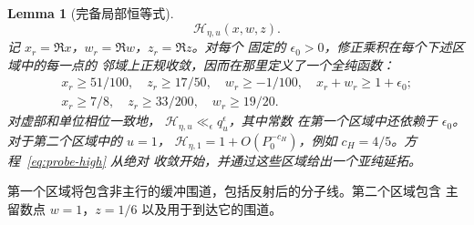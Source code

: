\documentclass[11pt,a4paper]{article}
\numberwithin{equation}{section}
\numberwithin{figure}{section}
\newtheorem{lemma}[theorem]{Lemma}
\theoremstyle{definition}
\theoremstyle{remark}
\begin{document}
\begin{lemma}[完备局部恒等式]
\begin{equation}
 \mathcal H_{\eta,u}(x,w,z).
\end{equation}
记 $x_r=\Re x$，$w_r=\Re w$，$z_r=\Re z$。对每个
固定的 $\epsilon_0>0$，修正乘积在每个下述区域中的每一点的
邻域上正规收敛，因而在那里定义了一个全纯函数：
\begin{align}
 x_r\ge51/100,\quad z_r\ge17/50,\quad w_r\ge-1/100,\quad
 x_r+w_r\ge1+\epsilon_0;\label{eq:local-region-one}\\
 x_r\ge7/8,\quad z_r\ge33/200,\quad w_r\ge19/20.
 \label{eq:local-region-two}
\end{align}
对虚部和单位相位一致地，
$\mathcal H_{\eta,u}\ll_\epsilon q_u^\epsilon$，其中常数
在第一个区域中还依赖于 $\epsilon_0$。对于第二个区域中的 $u=1$，
$\mathcal H_{\eta,1}=1+O(P_0^{-c_H})$，例如
$c_H=4/5$。方程~\eqref{eq:probe-high} 从绝对
收敛开始，并通过这些区域给出一个亚纯延拓。
\end{lemma}

第一个区域将包含非主行的缓冲围道，包括反射后的分子线。第二个区域包含
主留数点 $w=1$，$z=1/6$ 以及用于到达它的围道。
\end{document}
